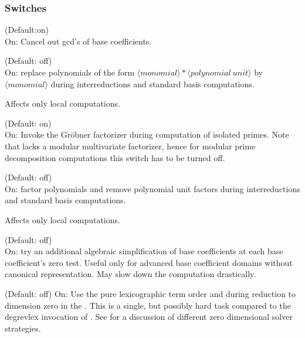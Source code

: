 \subsubsection*{Switches}

\begin{description}
\item{}
  \hypertarget{switch:BCSIMP}{}
  (Default:on) \\
  On: Cancel out gcd's of base coefficients.

\item[\sw{detectunits}]
  \hypertarget{switch:DETECTUNITS}{}
  (Default: off)\\
On: replace polynomials of the form 
$\langle monomial\rangle *
\langle polynomial\ unit\rangle $ by $\langle monomial\rangle$
during interreductions and standard basis computations.

Affects only local computations.

\item[\sw{factorprimes}]
  \hypertarget{switch:FACTORPRIMES}{}
  (Default: on)\\
On: Invoke the Gr\"obner factorizer during computation of isolated
primes.  Note that \REDUCE lacks a modular multivariate
factorizer, hence for modular prime decomposition computations this
switch has to be turned off.

\item[\sw{factorunits}]
  \hypertarget{switch:FACTORUNITS}{}
  (Default: off) \\
On: factor polynomials and remove polynomial unit factors
during interreductions and standard basis computations.

Affects only local computations.

\item[\sw{hardzerotest}]
  \hypertarget{switch:HARDZEROTEST}{}
  (Default: off) \\
  On: try an additional algebraic simplification of base
coefficients at each base coefficient's zero test. Useful only for
advanced base coefficient domains without canonical \REDUCE
representation. May slow down the computation drastically.

\item[\sw{lexefgb}]
  \hypertarget{switch:LEXEFGB}{}
  (Default: off)
On: Use the pure lexicographic term order and 
during reduction to dimension zero in the . This is a single, but possibly hard task compared to the
degrevlex invocation of . See \cite{Graebe:95b} for a
discussion of different zero dimensional solver strategies.


\end{description}
